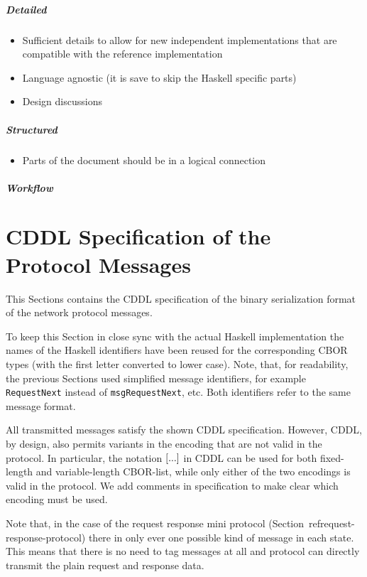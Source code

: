 \documentclass{report}
\theoremstyle{definition}{
  \newtheorem{lemma}{Lemma}[section] %
  \newtheorem{definition}[lemma]{Definition}
}
\theoremstyle{theorem}{
  \newtheorem{invariant}[lemma]{Invariant}
  \newtheorem{proofobligation}[lemma]{Proof Obligation}
}
\numberwithin{equation}{lemma}
\begin{document}
\subparagraph{Detailed}
\begin{itemize}
\item Sufficient details to allow for new independent implementations that are compatible with
the reference implementation
\item Language agnostic (it is save to skip the Haskell specific parts)
\item Design discussions
\end{itemize}
\subparagraph{Structured}
\begin{itemize}
\item Parts of the document should be in a logical connection
\end{itemize}
\subparagraph{Workflow}

\appendix
\section{CDDL Specification of the Protocol Messages}
\label{included-cddl}
\label{CBOR-section}
This Sections contains the CDDL\cite{cddl} specification
of the binary serialization format of the network protocol messages.

To keep this Section in close sync with the actual Haskell implementation
the names of the Haskell identifiers have been reused for the corresponding
CBOR types (with the first letter converted to lower case).
Note, that, for readability, the previous Sections used simplified message identifiers,
for example {\tt RequestNext} instead of {\tt msgRequestNext}, etc.
Both identifiers refer to the same message format.

All transmitted messages satisfy the shown CDDL specification.
However, CDDL, by design, also permits variants in the encoding that are not valid in the protocol.
In particular, the notation ${\tt [} ... {\tt ]}$ in CDDL can be used for both fixed-length  
and variable-length CBOR-list, while only either of the two encodings is valid in the protocol.
We add comments in specification to make clear which encoding must be used.

Note that, in the case of the request response mini protocol (Section~ref{request-response-protocol})
there in only ever one possible kind of message in each state.
This means that there is no need to tag messages at all and protocol can directly transmit the plain
request and response data.




\end{document}
